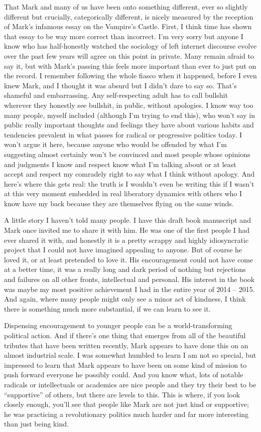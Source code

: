 \documentclass[a4paper,12pt,margin=.5in]{article}
\begin{document}
That Mark and many of us have been onto something different, ever so
slightly different but crucially, categorically different, is nicely
measured by the reception of Mark's infamous essay on the Vampire's
Castle. First, I think time has shown that essay to be way more correct
than incorrect. I'm very sorry but anyone I know who has half-honestly
watched the sociology of left internet discourse evolve over the past
few years will agree on this point in private. Many remain afraid to say
it, but with Mark's passing this feels more important than ever to just
put on the record. I remember following the whole fiasco when it
happened, before I even knew Mark, and I thought it was absurd but I
didn't dare to say so. That's shameful and embarrassing. Any
self-respecting adult has to call bullshit wherever they honestly see
bullshit, in public, without apologies. I know way too many people,
myself included (although I'm trying to end this), who won't say in
public really important thoughts and feelings they have about various
habits and tendencies prevalent in what passes for radical or
progressive politics today. I won't argue it here, because anyone who
would be offended by what I'm suggesting almost certainly won't be
convinced and most people whose opinions and judgments I know and
respect know what I'm talking about or at least accept and respect my
comradely right to say what I think without apology. And here's where
this gets real: the truth is I wouldn't even be writing this if I wasn't
at this very moment embedded in real liberatory dynamics with others who
I know have my back because they are themselves flying on the same
winds.

A little story I haven't told many people. I have this draft book
manuscript and Mark once invited me to share it with him. He was one of
the first people I had ever shared it with, and honestly it is a pretty
scrappy and highly idiosyncratic project that I could not have imagined
appealing to anyone. But of course he loved it, or at least pretended to
love it. His encouragement could not have come at a better time, it was
a really long and dark period of nothing but rejections and failures on
all other fronts, intellectual and personal. His interest in the book
was maybe my most positive achievement I had in the entire year of 2014
-- 2015. And again, where many people might only see a minor act of
kindness, I think there is something much more substantial, if we can
learn to see it.

Dispensing encouragement to younger people can be a world-transforming
political action. And if there's one thing that emerges from all of the
beautiful tributes that have been written recently, Mark appears to have
done this on an almost industrial scale. I was somewhat humbled to learn
I am not so special, but impressed to learn that Mark appears to have
been on some kind of mission to push forward everyone he possibly could.
And you know what, lots of notable radicals or intellectuals or
academics are nice people and they try their best to be ``supportive''
of others, but there are levels to this. This is where, if you look
closely enough, you'll see that people like Mark are not just kind or
supportive; he was practicing a revolutionary politics much harder and
far more interesting than just being kind.
\end{document}

